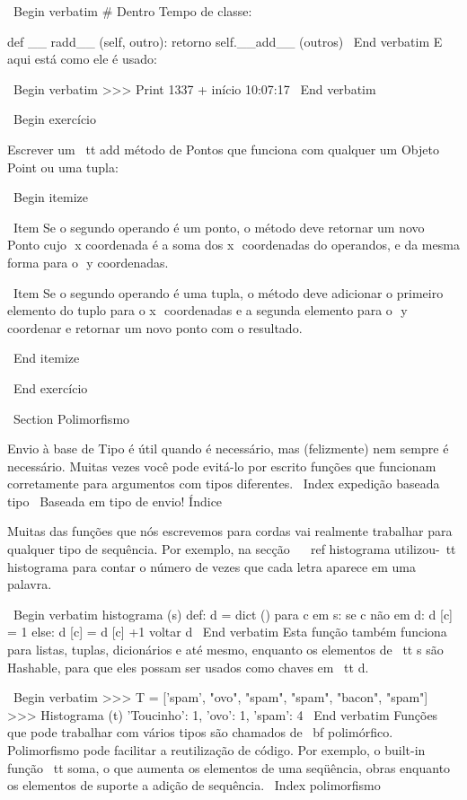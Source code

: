 \documentclass[10pt]{book}
\begin{document}
\begin {itemize}
{{{{{{{{{{{{{{\ Begin {verbatim}
# Dentro Tempo de classe:

    def __ radd__ (self, outro):
        retorno self.__add__ (outros)
\ End {verbatim}
%
E aqui está como ele é usado:

\ Begin {verbatim}
>>> Print 1337 + início
10:07:17
\ End {verbatim}
%

\ Begin {} exercício

Escrever um {\ tt add} método de Pontos que funciona com qualquer um
Objeto Point ou uma tupla:  

\ Begin {itemize}

\ Item Se o segundo operando é um ponto, o método deve retornar um novo
Ponto cujo $ $ x coordenada é a soma dos x $ $ coordenadas do
operandos, e da mesma forma para o $ $ y coordenadas.

\ Item Se o segundo operando é uma tupla, o método deve adicionar o
primeiro elemento do tuplo para o x $ $ coordenadas e a segunda
elemento para o $ $ y coordenar e retornar um novo ponto com o resultado. 

\ End {itemize}

\ End {} exercício

\ Section {} Polimorfismo

Envio à base de Tipo é útil quando é necessário, mas (felizmente)
nem sempre é necessário. Muitas vezes você pode evitá-lo por escrito funções
que funcionam corretamente para argumentos com tipos diferentes.
\ Index {expedição baseada tipo}
\ {Baseada em tipo de envio!} Índice

Muitas das funções que nós escrevemos para cordas vai realmente
trabalhar para qualquer tipo de sequência.
Por exemplo, na secção ~ \ ref {histograma}
utilizou-{\ tt histograma} para contar o número de vezes que cada letra
aparece em uma palavra.

\ Begin {verbatim}
histograma (s) def:
    d = dict ()
    para c em s:
        se c não em d:
            d [c] = 1
        else:
            d [c] = d [c] +1
    voltar d
\ End {verbatim}
%
Esta função também funciona para listas, tuplas, dicionários e até mesmo,
enquanto os elementos de {\ tt s} são Hashable, para que eles possam ser usados
como chaves em {\ tt d}.

\ Begin {verbatim}
>>> T = ['spam', "ovo", "spam", "spam", "bacon", "spam"]
>>> Histograma (t)
{'Toucinho': 1, 'ovo': 1, 'spam': 4}
\ End {verbatim}
%
Funções que pode trabalhar com vários tipos são chamados de {\ bf polimórfico}.
Polimorfismo pode facilitar a reutilização de código. Por exemplo, o built-in
função {\ tt soma}, o que aumenta os elementos de uma seqüência, obras
enquanto os elementos de suporte a adição de sequência.
\ Index {polimorfismo}

}}}}}}}}}}}}}}
\end{itemize}
\end{document}
